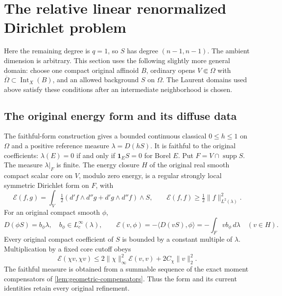 \documentclass[11pt,reqno]{amsart}
\theoremstyle{definition}
\theoremstyle{remark}
\numberwithin{equation}{section}
\newcommand{\supp}{\operatorname{supp}}
\begin{document}
\section{The relative linear renormalized Dirichlet problem}
\label{sec:linear-dirichlet}

Here the remaining degree is $q=1$, so $S$ has degree $(n-1,n-1)$.
The ambient dimension is arbitrary. This section uses the following
slightly more general domain: choose one compact original affinoid $B$,
ordinary opens $V\Subset\Omega$ with
$\overline\Omega\subset\operatorname{Int}_X(B)$, and an allowed
background $S$ on $\Omega$. The Laurent domains used above satisfy
these conditions after an intermediate neighborhood is chosen.

\subsection{The original energy form and its diffuse data}

The faithful-form construction
\cite[Theorem \emph{A faithful coercive original form without algebraizability}
and its part-space corollary]{Energy} gives a bounded continuous
classical $0\le h\le1$ on $\Omega$ and a positive reference measure
$\lambda=D(hS)$. It is faithful to the original coefficients:
$\lambda(E)=0$ if and only if $\mathbf1_ES=0$ for Borel $E$.
Put $F=V\cap\supp S$. The measure $\lambda|_F$ is finite.
The energy closure $H$ of the original real smooth compact scalar
core on $V$, modulo zero energy, is a regular strongly local symmetric
Dirichlet form on $F$, with
\begin{equation}\label{eq:linear-form}
 \mathcal E(f,g)=\int_V\tfrac12
        (d'f\wedge d''g+d'g\wedge d''f)\wedge S,
 \qquad \mathcal E(f,f)\ge\tfrac12\|f\|_{L^2(\lambda)}^2.
\end{equation}
For an original compact smooth $\phi$,
\begin{equation}\label{eq:original-form-coefficients}
 D(\phi S)=b_\phi\lambda,\quad b_\phi\in L^\infty_c(\lambda),
 \qquad
 \mathcal E(v,\phi)=-\langle D(vS),\phi\rangle
                   =-\int_Fv b_\phi\,d\lambda\quad(v\in H).
\end{equation}
Every original compact coefficient of $S$ is bounded by a constant
multiple of $\lambda$. Multiplication by a fixed core cutoff obeys
\begin{equation}\label{eq:cutoff-energy}
 \mathcal E(\chi v,\chi v)
 \le2\|\chi\|_\infty^2\mathcal E(v,v)+2C_\chi\|v\|_2^2.
\end{equation}
The faithful measure is obtained from a summable sequence of the exact
moment compensators of \cref{lem:geometric-compensators}. Thus the
form and its current identities retain every original refinement.
\end{document}
